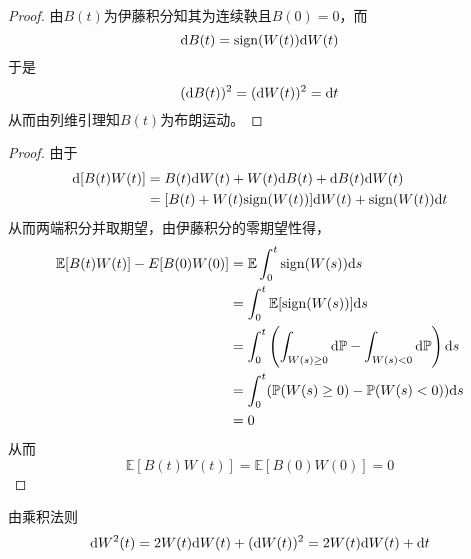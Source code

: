 \documentclass[cn]{homework}
\newcommand{\E}{\mathbb E}
\newcommand{\prob}{\mathbb P}
\begin{document}
    \problem[习题4.19]
    \begin{subproblem}
        \item
        \newcommand{\sgn}{\mathrm{sign}}
        \begin{proof}
            由$B(t)$为伊藤积分知其为连续鞅且$B(0)=0$，而
            \[\diff B(t)=\sgn(W(t))\diff W(t)\]
            于是
            \[(\mathrm d B(t))^2=(\mathrm d W(t))^2=\mathrm d t\]
            从而由列维引理知$B(t)$为布朗运动。
        \end{proof}

        \item
        \begin{proof}
            由于
            \[\begin{aligned}
                \diff[B(t)W(t)]&=B(t)\diff W(t)+W(t)\diff B(t)+\diff B(t)\diff W(t)\\
                &=[B(t)+W(t)\sgn(W(t))]\diff W(t)+\sgn(W(t))\diff t
            \end{aligned}\]
            从而两端积分并取期望，由伊藤积分的零期望性得，
            \[\begin{aligned}
                \E[B(t)W(t)]-E[B(0)W(0)]&=\E\int_0^t\sgn(W(s))\diff s\\
                &=\int_0^t\E[\sgn(W(s))]\diff s\\
                &=\int_0^t\left(\int_{W(s)\geq 0}\diff\prob
                -\int_{W(s)<0}\diff\prob\right)\diff s\\
                &=\int_0^t(\prob(W(s)\geq 0)-\prob(W(s)<0))\diff s\\
                &=0
            \end{aligned}\]
            从而
            \[\E[B(t)W(t)]=\E[B(0)W(0)]=0\]
        \end{proof}

        \item
        由乘积法则
        \[\mathrm d W^2(t)=2W(t)\mathrm d W(t)+(\mathrm d W(t))^2=2W(t)\mathrm d W(t)+\mathrm d t\]


\end{subproblem}
\end{document}
